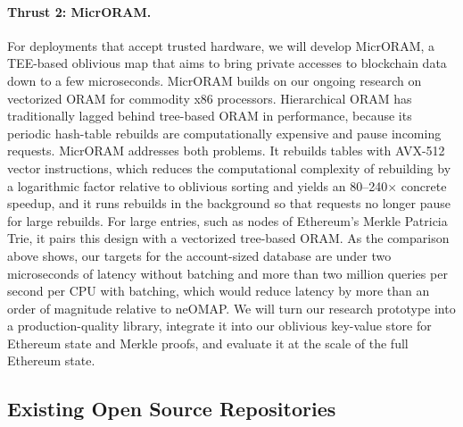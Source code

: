 
\paragraph{Thrust 2: MicrORAM.}
For deployments that accept trusted hardware, we will develop MicrORAM, a
TEE-based oblivious map that aims to bring private accesses to blockchain
data down to a few microseconds. MicrORAM builds on our ongoing research
on vectorized ORAM for commodity x86 processors. Hierarchical ORAM has
traditionally lagged behind tree-based ORAM in performance, because its
periodic hash-table rebuilds are computationally expensive and pause
incoming requests. MicrORAM addresses both problems. It rebuilds tables
with AVX-512 vector instructions, which reduces the computational
complexity of rebuilding by a logarithmic factor relative to oblivious
sorting and yields an 80--240$\times$ concrete speedup, and it runs
rebuilds in the background so that requests no longer pause for large
rebuilds. For large
entries, such as nodes of Ethereum's Merkle Patricia Trie, it pairs this
design with a vectorized tree-based ORAM. As the comparison above shows,
our targets for the account-sized database are under two microseconds of
latency without batching and more than two million queries per second per
CPU with batching, which would reduce latency by more than an order of
magnitude relative to neOMAP. We will turn our research prototype into a
production-quality library, integrate it into our oblivious key-value
store for Ethereum state and Merkle proofs, and evaluate it at the scale of
the full Ethereum state.


\subsection{Existing Open Source Repositories}

